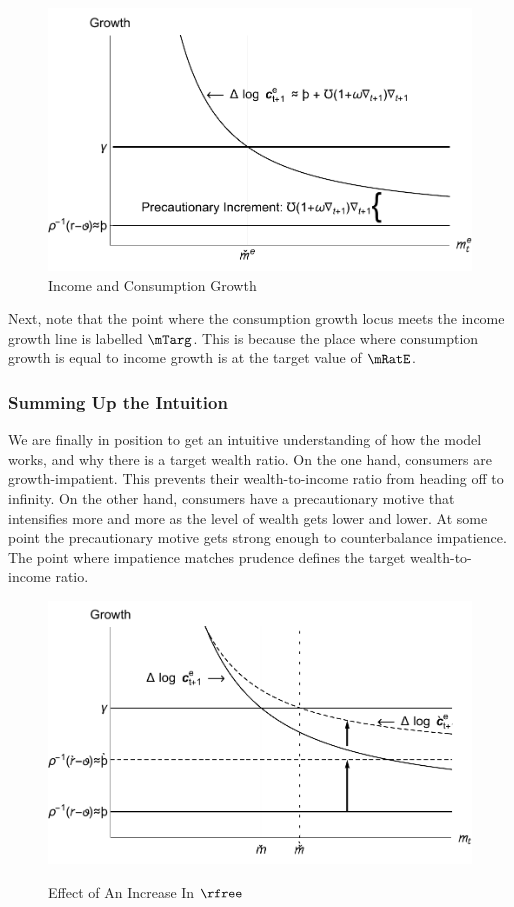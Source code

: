 \documentclass{handout}
\begin{document}
\begin{figure}
\caption{Income and Consumption Growth}\label{fig:GrowthA}
\includegraphics[width=6in]{../Figures/TractableBufferStockGrowthA}
\end{figure}

Next, note that the point where the consumption growth locus
meets the income growth line is labelled $\mTarg^{\null}$.  This is
because the place where consumption growth is equal to income
growth is at the target value of $\mRatE$.



\subsubsection{Summing Up the Intuition}
We are finally in position to get an intuitive understanding of how the
model works, and why there is a target wealth ratio.  On the one hand,
consumers are growth-impatient.  This prevents their wealth-to-income ratio
from heading off to infinity.  On the other hand, consumers have
a precautionary motive that intensifies more and more as the level of
wealth gets lower and lower.  At some point the precautionary motive
gets strong enough to counterbalance impatience.  The point where impatience matches prudence defines the
target wealth-to-income ratio.


\begin{figure}
\caption{Effect of An Increase In $\rfree$}
\includegraphics[width=6in]{../Figures/TractableBufferStockGrowthB}
\label{fig:GrowthB}
\end{figure}
\end{document}
